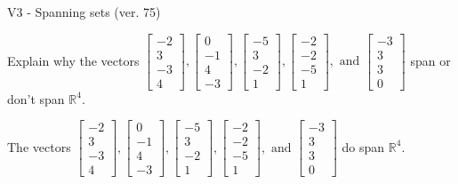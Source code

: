 \begin{exercise}
  \begin{exerciseTitle}V3 - Spanning sets (ver. 75)\end{exerciseTitle}
  \begin{exerciseStatement}
    Explain why the vectors \(\left[\begin{array}{r}
-2 \\
3 \\
-3 \\
4
\end{array}\right] , \left[\begin{array}{r}
0 \\
-1 \\
4 \\
-3
\end{array}\right] , \left[\begin{array}{r}
-5 \\
3 \\
-2 \\
1
\end{array}\right] , \left[\begin{array}{r}
-2 \\
-2 \\
-5 \\
1
\end{array}\right] , \text{ and } \left[\begin{array}{r}
-3 \\
3 \\
3 \\
0
\end{array}\right]\) span or don't span \(\mathbb{R}^4\). 
	


  \end{exerciseStatement}
  \begin{exerciseAnswer}
   The vectors \(\left[\begin{array}{r}
-2 \\
3 \\
-3 \\
4
\end{array}\right] , \left[\begin{array}{r}
0 \\
-1 \\
4 \\
-3
\end{array}\right] , \left[\begin{array}{r}
-5 \\
3 \\
-2 \\
1
\end{array}\right] , \left[\begin{array}{r}
-2 \\
-2 \\
-5 \\
1
\end{array}\right] , \text{ and } \left[\begin{array}{r}
-3 \\
3 \\
3 \\
0
\end{array}\right]\) 
  	 do  
	span \(\mathbb{R}^4\).
  



\end{exerciseAnswer}
\end{exercise}
